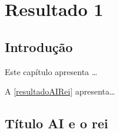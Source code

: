 \chapter{Resultado 1}
\label{cap_resultadoAI}

\section{Introdução}

Este capítulo apresenta \ldots

A \autoref{resultadoAIRei} apresenta\ldots

\section{Título AI e o rei}\label{resultadoAIRei}

